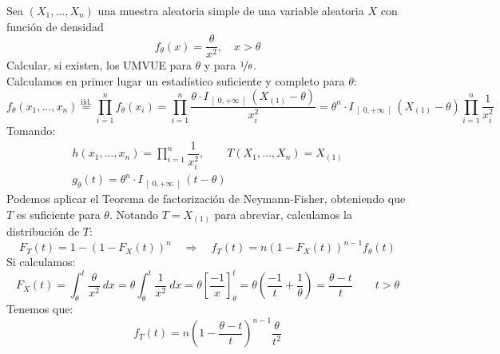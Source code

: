 \begin{ejercicio}
    Sea $(X_1, \ldots, X_n)$ una muestra aleatoria simple de una variable aleatoria $X$ con función de densidad
    \begin{equation*}
        f_\theta(x) = \dfrac{\theta}{x^2}, \quad x>\theta
    \end{equation*}
    Calcular, si existen, los UMVUE para $\theta$ y para $\nicefrac{1}{\theta}$.\\

    \noindent
    Calculamos en primer lugar un estadístico suficiente y completo para $\theta$:
    \begin{equation*}
        f_\theta(x_1,\ldots, x_n) \stackrel{\text{iid.}}{=} \prod_{i=1}^{n}f_\theta(x_i) =\prod_{i=1}^{n} \dfrac{\theta\cdot I_{\left]0,+\infty\right[}(X_{(1)}-\theta)}{x_i^2} = \theta^n \cdot I_{\left]0,+\infty\right[}(X_{(1)}-\theta)\prod_{i=1}^{n} \dfrac{1}{x_i^2}
    \end{equation*}
    Tomando:
    \begin{gather*}
        h(x_1, \ldots, x_n) = \prod_{i=1}^{n}\dfrac{1}{x_i^2}, \qquad T(X_1, \ldots, X_n) = X_{(1)} \\
        g_\theta(t) = \theta^n \cdot I_{\left]0,+\infty\right[}(t-\theta)
    \end{gather*}
    Podemos aplicar el Teorema de factorización de Neymann-Fisher, obteniendo que $T$ es suficiente para $\theta$. Notando $T = X_{(1)}$ para abreviar, calculamos la distribución de $T$:
    \begin{equation*}
        F_T(t) = 1-{(1-F_X(t))}^{n} \quad \Longrightarrow \quad f_T(t) = n{(1-F_X(t))}^{n-1}f_\theta(t)
    \end{equation*}
    Si calculamos:
    \begin{equation*}
        F_X(t) = \int_{\theta}^{t} \dfrac{\theta}{x^2}~dx  = \theta \int_{\theta}^{t} \dfrac{1}{x^2}~dx = \theta \left[\dfrac{-1}{x}\right]_\theta^t = \theta\left(\dfrac{-1}{t}+\dfrac{1}{\theta}\right) = \dfrac{\theta-t}{t} \qquad  t > \theta
    \end{equation*}
    Tenemos que:
    \begin{equation*}
        f_T(t) = n{\left(1-\dfrac{\theta-t}{t}\right)}^{n-1}\dfrac{\theta}{t^2}
    \end{equation*} %
\end{ejercicio}

